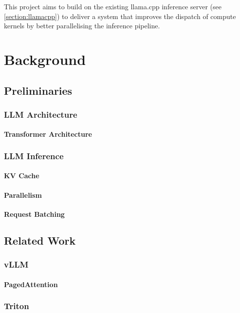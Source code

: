 \documentclass[12pt,twoside]{report}
\begin{document}
This project aims to build on the existing llama.cpp inference server (see \ref{section:llamacpp}) to deliver a system that improves the dispatch of compute kernels by better parallelising the inference pipeline.

\chapter{Background} %
\section{Preliminaries}
\subsection{LLM Architecture}
\subsubsection{Transformer Architecture}

\subsection{LLM Inference}
\subsubsection{KV Cache}
\subsubsection{Parallelism}
\subsubsection{Request Batching}

\section{Related Work}
\subsection{vLLM}
\subsubsection{PagedAttention}
\subsection{Triton}
\end{document}

